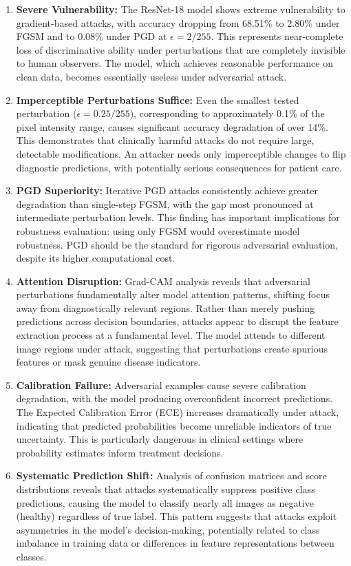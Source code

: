 \documentclass[12pt,a4paper]{article}
\begin{document}
\begin{enumerate}[leftmargin=*]
    \item \textbf{Severe Vulnerability:} The ResNet-18 model shows extreme vulnerability to gradient-based attacks, with accuracy dropping from 68.51\% to 2.80\% under FGSM and to 0.08\% under PGD at $\epsilon=2/255$. This represents near-complete loss of discriminative ability under perturbations that are completely invisible to human observers. The model, which achieves reasonable performance on clean data, becomes essentially useless under adversarial attack.
    
    \item \textbf{Imperceptible Perturbations Suffice:} Even the smallest tested perturbation ($\epsilon=0.25/255$), corresponding to approximately 0.1\% of the pixel intensity range, causes significant accuracy degradation of over 14\%. This demonstrates that clinically harmful attacks do not require large, detectable modifications. An attacker needs only imperceptible changes to flip diagnostic predictions, with potentially serious consequences for patient care.
    
    \item \textbf{PGD Superiority:} Iterative PGD attacks consistently achieve greater degradation than single-step FGSM, with the gap most pronounced at intermediate perturbation levels. This finding has important implications for robustness evaluation: using only FGSM would overestimate model robustness. PGD should be the standard for rigorous adversarial evaluation, despite its higher computational cost.
    
    \item \textbf{Attention Disruption:} Grad-CAM analysis reveals that adversarial perturbations fundamentally alter model attention patterns, shifting focus away from diagnostically relevant regions. Rather than merely pushing predictions across decision boundaries, attacks appear to disrupt the feature extraction process at a fundamental level. The model attends to different image regions under attack, suggesting that perturbations create spurious features or mask genuine disease indicators.
    
    \item \textbf{Calibration Failure:} Adversarial examples cause severe calibration degradation, with the model producing overconfident incorrect predictions. The Expected Calibration Error (ECE) increases dramatically under attack, indicating that predicted probabilities become unreliable indicators of true uncertainty. This is particularly dangerous in clinical settings where probability estimates inform treatment decisions.
    
    \item \textbf{Systematic Prediction Shift:} Analysis of confusion matrices and score distributions reveals that attacks systematically suppress positive class predictions, causing the model to classify nearly all images as negative (healthy) regardless of true label. This pattern suggests that attacks exploit asymmetries in the model's decision-making, potentially related to class imbalance in training data or differences in feature representations between classes.
\end{enumerate}
\end{document}
